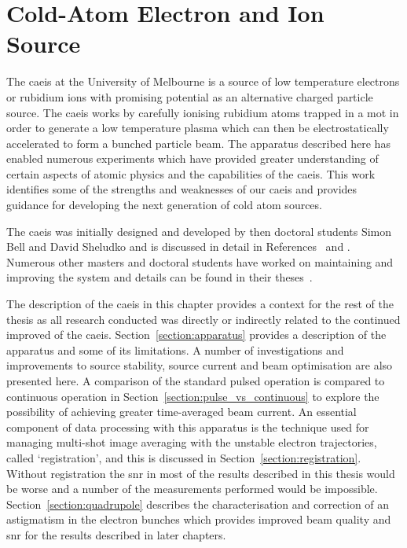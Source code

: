 \chapter{Cold-Atom Electron and Ion Source}\label{chapter:setup}

The \gls{caeis} at the University of Melbourne is a source of low temperature electrons or rubidium ions with promising potential as an alternative charged particle source.
The \gls{caeis} works by carefully ionising rubidium atoms trapped in a \gls{mot} in order to generate a low temperature plasma which can then be electrostatically accelerated to form a bunched particle beam.
The apparatus described here has enabled numerous experiments which have provided greater understanding of certain aspects of atomic physics and the capabilities of the \gls{caeis}.
This work identifies some of the strengths and weaknesses of our \gls{caeis} and provides guidance for developing the next generation of cold atom sources.

The \gls{caeis} was initially designed and developed by then doctoral students Simon Bell and David Sheludko and is discussed in detail in References~\cite{sheludko_shaped_2010} and \cite{bell_cold_2011}.
Numerous other masters and doctoral students have worked on maintaining and improving the system and details can be found in their theses~\cite{saliba_cold_2011,mcculloch_generation_2013,taylor_rydberg_2013,tielen_development_2015,murphy_measurement_2017,speirs_electron_2017}.

The description of the \gls{caeis} in this chapter provides a context for the rest of the thesis as all research conducted was directly or indirectly related to the continued improved of the \gls{caeis}.
Section~\ref{section:apparatus} provides a description of the apparatus and some of its limitations.
A number of investigations and improvements to source stability, source current and beam optimisation are also presented here.
A comparison of the standard pulsed operation is compared to continuous operation in Section~\ref{section:pulse_vs_continuous} to explore the possibility of achieving greater time-averaged beam current.
An essential component of data processing with this apparatus is the technique used for managing multi-shot image averaging with the unstable electron trajectories, called `registration', and this is discussed in Section~\ref{section:registration}.
Without registration the \gls{snr} in most of the results described in this thesis would be worse and a number of the measurements performed would be impossible.
Section~\ref{section:quadrupole} describes the characterisation and correction of an astigmatism in the electron bunches which provides improved beam quality and \gls{snr} for the results described in later chapters.

